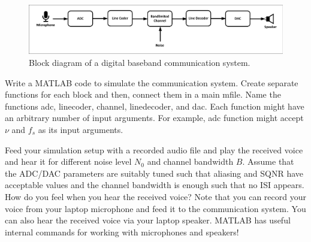 \documentclass[11pt]{article}
\begin{document}

\begin{question}
\begin{figure}[h]
\centering
\includegraphics[scale=0.6]{Fig/model.pdf}
\caption{Block diagram of a digital baseband communication system.}\label{fig:model}
\end{figure}
\begin{subquestion}{Write a MATLAB code to simulate the communication system. Create separate functions for each block and then, connect them in a main mfile. Name the functions adc, linecoder, channel, linedecoder, and dac. Each function might have an arbitrary number of input arguments. For example, adc function might accept $\nu$ and $f_s$ as its input arguments.
} 
\end{subquestion}
\begin{subquestion}{Feed your simulation setup with a recorded audio file and play the received voice and hear it for different noise level $N_0$ and channel bandwidth $B$. Assume that the ADC/DAC parameters are suitably tuned such that aliasing and SQNR have acceptable values and the channel bandwidth is enough such that no ISI appears. How do you feel when you hear the received voice? Note that you can record your voice from your laptop microphone and feed it to the communication system. You can also hear the received voice via your laptop speaker. MATLAB has useful internal commands for working with microphones and speakers!
}
\end{subquestion}
\end{question}
\end{document}

